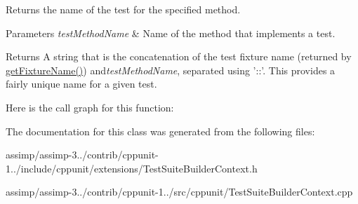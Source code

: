 Returns the name of the test for the specified method. 


\begin{DoxyParams}{Parameters}
{\em test\+Method\+Name} & Name of the method that implements a test. \\
\hline
\end{DoxyParams}
\begin{DoxyReturn}{Returns}
A string that is the concatenation of the test fixture name (returned by \hyperlink{class_test_suite_builder_context_base_abba530361ccd63ddf23fcbdc4f33727f}{get\+Fixture\+Name()}) and{\itshape test\+Method\+Name}, separated using '\+:\+:'. This provides a fairly unique name for a given test. 
\end{DoxyReturn}


Here is the call graph for this function\+:




The documentation for this class was generated from the following files\+:\begin{DoxyCompactItemize}
\item 
assimp/assimp-\/3../contrib/cppunit-\/1../include/cppunit/extensions/Test\+Suite\+Builder\+Context.\+h\item 
assimp/assimp-\/3../contrib/cppunit-\/1../src/cppunit/Test\+Suite\+Builder\+Context.\+cpp\end{DoxyCompactItemize}
